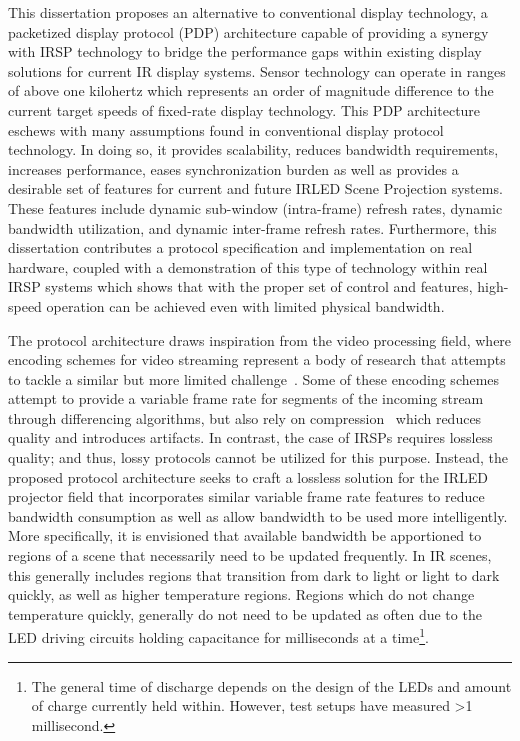 This dissertation proposes an alternative to conventional display technology, a packetized display protocol (PDP) architecture capable of providing a synergy with IRSP technology to bridge the performance gaps within existing display solutions for current IR display systems. Sensor technology can operate in ranges of above one kilohertz which represents an order of magnitude difference to the current target speeds of fixed-rate display technology. This PDP architecture eschews with many assumptions found in conventional display protocol technology. In doing so, it provides scalability, reduces bandwidth requirements, increases performance, eases synchronization burden as well as provides a desirable set of features for current and future IRLED Scene Projection systems. These features include dynamic sub-window (intra-frame) refresh rates, dynamic bandwidth utilization, and dynamic inter-frame refresh rates. Furthermore, this dissertation contributes a protocol specification and implementation on real hardware, coupled with a demonstration of this type of technology within real IRSP systems which shows that with the proper set of control and features, high-speed operation can be achieved even with limited physical bandwidth.

The protocol architecture draws inspiration from the video processing field, where encoding schemes for video streaming represent a body of research that attempts to tackle a similar but more limited challenge~\cite{BakarEtAl2017}. Some of these encoding schemes attempt to provide a variable frame rate for segments of the incoming stream through differencing algorithms, but also rely on compression~\cite{CastilloEtAl2012} which reduces quality and introduces artifacts. In contrast, the case of IRSPs requires lossless quality; and thus, lossy protocols cannot be utilized for this purpose. Instead, the proposed protocol architecture seeks to craft a lossless solution for the IRLED projector field that incorporates similar variable frame rate features to reduce bandwidth consumption as well as allow bandwidth to be used more intelligently. More specifically, it is envisioned that available bandwidth be apportioned to regions of a scene that necessarily need to be updated frequently. In IR scenes, this generally includes regions that transition from dark to light or light to dark quickly, as well as higher temperature regions. Regions which do not change temperature quickly, generally do not need to be updated as often due to the LED driving circuits holding capacitance for milliseconds at a time\footnote{The general time of discharge depends on the design of the LEDs and amount of charge currently held within. However, test setups have measured \textgreater1 millisecond.}.

